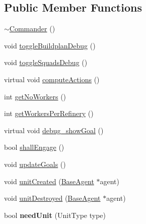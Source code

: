 \subsection*{Public Member Functions}
\begin{DoxyCompactItemize}
\item 
\hyperlink{class_commander_af16b5b1c2b22e5158ce822d1b9180b10}{$\sim$\-Commander} ()
\item 
void \hyperlink{class_commander_aea760bef28ae7c34525c3d8738242926}{toggle\-Buildplan\-Debug} ()
\item 
void \hyperlink{class_commander_a9e509e1e94e0baf2cf97299e7b328bf2}{toggle\-Squads\-Debug} ()
\item 
virtual void \hyperlink{class_commander_a7d01a74af4cf5ed47f9164d6a153b0b5}{compute\-Actions} ()
\item 
int \hyperlink{class_commander_ab33008fea8bba27e56a3b4ca9282c0d9}{get\-No\-Workers} ()
\item 
int \hyperlink{class_commander_ae69c51a54be14697c5d1d0b9cd9a39b2}{get\-Workers\-Per\-Refinery} ()
\item 
virtual void \hyperlink{class_commander_a1785426df06270f82e44cba5d704ad9d}{debug\-\_\-show\-Goal} ()
\item 
bool \hyperlink{class_commander_a68db23d58ca867d9ed68c3fb66ecf68e}{shall\-Engage} ()
\item 
void \hyperlink{class_commander_a6b47f5f3420eabefbcd39459ee3c268a}{update\-Goals} ()
\item 
void \hyperlink{class_commander_a8a5b895fbbc7c4b1010e745e109e3775}{unit\-Created} (\hyperlink{class_base_agent}{Base\-Agent} $\ast$agent)
\item 
void \hyperlink{class_commander_a891be0d981a280c9584c71a8d07576c3}{unit\-Destroyed} (\hyperlink{class_base_agent}{Base\-Agent} $\ast$agent)
\item 
\hypertarget{class_commander_a75110993e6f09ef98a70b04ffe22a39d}{bool {\bfseries need\-Unit} (Unit\-Type type)}\label{class_commander_a75110993e6f09ef98a70b04ffe22a39d}


\end{DoxyCompactItemize}
